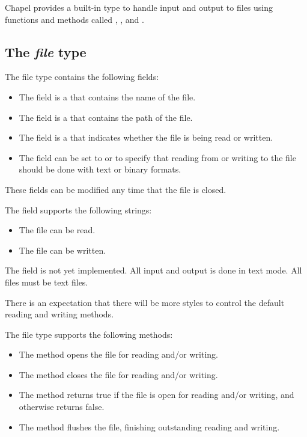 \label{Input_and_Output}

Chapel provides a built-in  type to handle input and output
to files using functions and methods called , ,
and .

\subsection{The {\em file} type}

The file type contains the following fields:
\begin{itemize}
\item
The  field is a  that contains the name of
the file.
\item
The  field is a  that contains the path of the
file.
\item
The  field is a  that indicates whether the
file is being read or written.
\item
The  field can be set to  or  to
specify that reading from or writing to the file should be done with
text or binary formats.
\end{itemize}
These fields can be modified any time that the file is closed.

The  field supports the following strings:
\begin{itemize}
\item
{} The file can be read.
\item
{} The file can be written.
\end{itemize}

\begin{implementation}
The  field is not yet implemented.  All input and output
is done in text mode.  All files must be text files.

There is an expectation that there will be more styles to control the
default reading and writing methods.
\end{implementation}

The file type supports the following methods:
\begin{itemize}
\item
The  method opens the file for reading and/or writing.
\item
The  method closes the file for reading and/or writing.
\item
The  method returns true if the file is open for reading
and/or writing, and otherwise returns false.
\item
The  method flushes the file, finishing outstanding
reading and writing.
\end{itemize}

